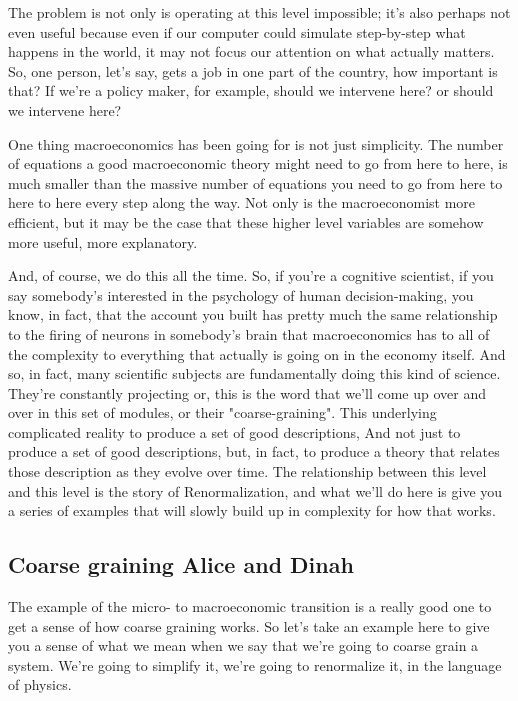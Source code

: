 \documentclass[]{article}
\begin{document}
The problem is not only is operating at this level impossible;
it's also perhaps not even 
useful because even if our
computer could simulate step-by-step 
what happens in the world,
it may not focus our attention on
what actually matters.
So, one person, let's say, gets a
job in one part of the country,
how important is that?
If we're a policy maker, 
for example,
should we intervene here?
or should we intervene here?

One thing macroeconomics has 
been going for is not just simplicity.
The number of equations a good 
macroeconomic theory might need
to go from here to here, is much 
smaller than the massive number
of equations you need to go 
from here to here to here
every step along the way.
Not only is the macroeconomist
more efficient,
but it may be the case 
that these higher level
variables are somehow more 
useful, more explanatory.

And, of course, we 
do this all the time.
So, if you're a cognitive scientist, 
if you say somebody's interested
in the psychology of human 
decision-making, you know, in fact,
that the account you built has pretty 
much the same relationship
to the firing of neurons 
in somebody's brain
that macroeconomics has to 
all of the complexity to everything
that actually is going on in 
the economy itself.
And so, in fact, many 
scientific subjects are
fundamentally doing 
this kind of science.
They're constantly projecting or,
this is the word that we'll 
come up over and over in this
set of modules, or 
their "coarse-graining".
This underlying complicated reality to 
produce a set of good descriptions,
And not just to produce a set of 
good descriptions, but, in fact,
to produce a theory that relates those 
description as they evolve over time.
The relationship 
between this level
and this level is the 
story of Renormalization,
and what we'll do here is give
you a series of examples
that will slowly build up in 
complexity for how that works.

\subsection{Coarse graining Alice and Dinah}

The example of the micro-
to macroeconomic transition
is a really good one to get
a sense of how coarse graining works.
So let's take an example here
to give you a sense of what we mean
when we say that we're going
to coarse grain a system.
We're going to simplify it,
we're going to renormalize it,
in the language of physics.
\end{document}
